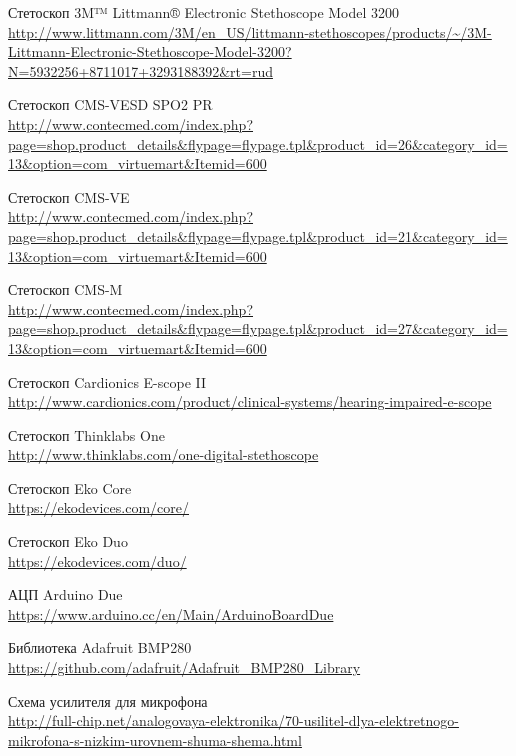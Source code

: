 \documentclass[../main.tex]{subfiles}
\begin{document}
\renewcommand\refname{Список использованных источников}
% 
\begin{thebibliography}{}

Стетоскоп 3M™ Littmann® Electronic Stethoscope Model 3200\\
\url{http://www.littmann.com/3M/en_US/littmann-stethoscopes/products/~/3M-Littmann-Electronic-Stethoscope-Model-3200?N=5932256+8711017+3293188392&rt=rud}

Стетоскоп CMS-VESD SPO2 PR\\
\url{http://www.contecmed.com/index.php?page=shop.product_details&flypage=flypage.tpl&product_id=26&category_id=13&option=com_virtuemart&Itemid=600}

Стетоскоп CMS-VE\\
\url{http://www.contecmed.com/index.php?page=shop.product_details&flypage=flypage.tpl&product_id=21&category_id=13&option=com_virtuemart&Itemid=600}

Стетоскоп CMS-M\\
\url{http://www.contecmed.com/index.php?page=shop.product_details&flypage=flypage.tpl&product_id=27&category_id=13&option=com_virtuemart&Itemid=600}

Стетоскоп Cardionics E-scope II\\
\url{http://www.cardionics.com/product/clinical-systems/hearing-impaired-e-scope}

Стетоскоп Thinklabs One\\
\url{http://www.thinklabs.com/one-digital-stethoscope}

Стетоскоп Eko Core\\
\url{https://ekodevices.com/core/}

Стетоскоп Eko Duo\\
\url{https://ekodevices.com/duo/}

АЦП Arduino Due\\
\url{https://www.arduino.cc/en/Main/ArduinoBoardDue}

Библиотека Adafruit BMP280\\
\url{https://github.com/adafruit/Adafruit_BMP280_Library}

Схема усилителя для микрофона\\
\url{http://full-chip.net/analogovaya-elektronika/70-usilitel-dlya-elektretnogo-mikrofona-s-nizkim-urovnem-shuma-shema.html}


\end{thebibliography}
\end{document}
